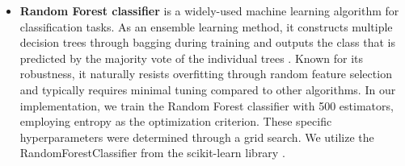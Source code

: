 \documentclass[gmd, manuscript]{copernicus}
\begin{document}
\begin{itemize}
    However, it is important to note that visual inspection of correlation plots between individual metadata values Figure~\ref{data_split} reveals rather fuzzy boundaries between clusters. This observation aligns with our expectations, given the diverse nature of urban, suburban, and rural locations across different countries, which can vary significantly in terms of industrial development, population density, and degree of urbanization in different countries \citep{zhang2024promoting}.
    \item  \textbf{Random Forest classifier}  is a widely-used machine learning algorithm for classification tasks. As an ensemble learning method, it constructs multiple decision trees through bagging during training and outputs the class that is predicted by the majority vote of the individual trees \citep{breiman2001random}. Known for its robustness, it naturally resists overfitting through random feature selection and typically requires minimal tuning compared to other algorithms.
    In our implementation, we train the Random Forest classifier with 500 estimators, employing entropy as the optimization criterion. These specific hyperparameters were determined through a grid search. We utilize the RandomForestClassifier from the scikit-learn library \citep{scikit-learn}.
    

\end{itemize}
\end{document}

